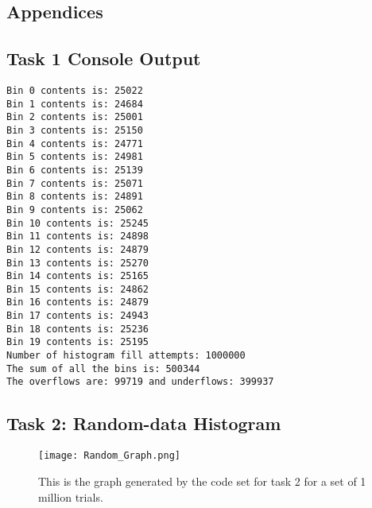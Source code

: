 \documentclass{article}
\begin{document}
\begin{center}

\section{Appendices}
\subsection{Task 1 Console Output}
\begin{lstlisting}
Bin 0 contents is: 25022
Bin 1 contents is: 24684
Bin 2 contents is: 25001
Bin 3 contents is: 25150
Bin 4 contents is: 24771
Bin 5 contents is: 24981
Bin 6 contents is: 25139
Bin 7 contents is: 25071
Bin 8 contents is: 24891
Bin 9 contents is: 25062
Bin 10 contents is: 25245
Bin 11 contents is: 24898
Bin 12 contents is: 24879
Bin 13 contents is: 25270
Bin 14 contents is: 25165
Bin 15 contents is: 24862
Bin 16 contents is: 24879
Bin 17 contents is: 24943
Bin 18 contents is: 25236
Bin 19 contents is: 25195
Number of histogram fill attempts: 1000000
The sum of all the bins is: 500344
The overflows are: 99719 and underflows: 399937
\end{lstlisting}

\subsection{Task 2: Random-data Histogram}
\begin{figure}[h]
	\texttt{[image: Random\_Graph.png]}
	\caption{This is the graph generated by the code set for task 2 for a set of 1 million trials.}
\end{figure}


\end{center}
\end{document}
